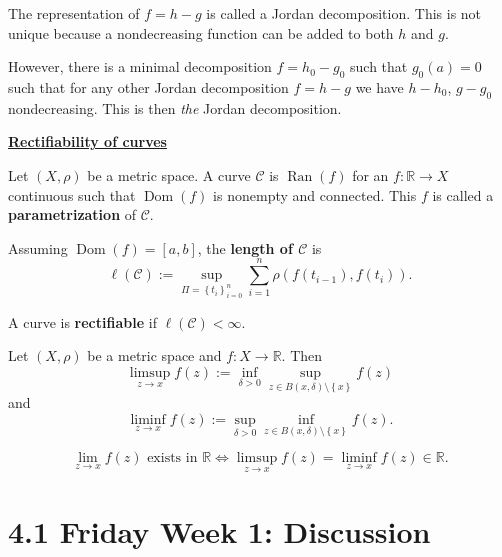 \documentclass{notes}
\begin{document}
  \strut
  
  The representation of $f = h - g$ is called a Jordan decomposition.
  This is not unique because a nondecreasing function can be added to both $h$ and $g$.
  
  However, there is a minimal decomposition $f = h_{0} - g_{0}$ such that $g_0(a) = 0$ such that for any other Jordan decomposition $f = h - g$ we have $h - h_0$, $g - g_0$ nondecreasing.
  This is then \textit{the} Jordan decomposition.
  
  \strut
  
  \underline{{\boldmath \bfseries Rectifiability of curves}}
  
  \begin{defn}
    Let $(X, \rho)$ be a metric space.
    A curve $\mathcal C$ is $\operatorname{Ran}(f)$ for an $f \colon \mathbb R \to X$ continuous such that $\operatorname{Dom}(f)$ is nonempty and connected.
    This $f$ is called a {\boldmath \bfseries parametrization} of $\mathcal C$.
  \end{defn}
  
  \begin{defn}
    Assuming $\operatorname{Dom}(f) = [a, b]$, the {\boldmath \bfseries length of $\mathcal C$} is 
    \[
      \ell(\mathcal C) := \sup_{\Pi = \left \{ t_i \right \}_{i = 0}^n} \sum_{i = 1}^n \rho(f(t_{i - 1}), f(t_i)).
    \]
  \end{defn}
  
  \begin{defn}
    A curve is {\boldmath \bfseries rectifiable} if $\ell(\mathcal C) < \infty$.
  \end{defn}
  
  \begin{defn}
    Let $(X, \rho)$ be a metric space and $f \colon X \to \mathbb R$.
    Then 
    \[
      \limsup_{z \to x} f(z) := \inf_{\delta > 0} \sup_{z \in B(x, \delta) \setminus \left \{ x \right \}} f(z)
    \]
    and 
    \[
      \liminf_{z \to x} f(z) := \sup_{\delta > 0} \inf_{z \in B(x, \delta) \setminus \left \{ x \right \}} f(z).
    \]
  \end{defn}
  
  \begin{lem}
    \[
      \lim_{z \to x} f(z) \text{ exists in $\mathbb R$} \Leftrightarrow \limsup_{z \to x} f(z) = \liminf_{z \to x} f(z) \in \mathbb R.
    \]
  \end{lem}
  
  \newpage
  
  \section{4.1 Friday Week 1: Discussion}
  
\end{document}
